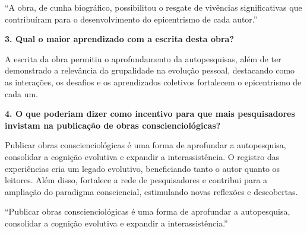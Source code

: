 \documentclass{gescons}
\begin{document}
\begin{multicols}{2}
\begin{pullquote}
``A obra, de cunha biográfico, possibilitou o resgate de vivências significativas que contribuíram para o desenvolvimento do epicentrismo de cada autor.''
\end{pullquote}


\textbf{3. Qual o maior aprendizado com a escrita desta obra?}

A escrita da obra permitiu o aprofundamento da autopesquisas, além de ter demonstrado a relevância da grupalidade na evolução pessoal, destacando como as interações, os desafios e os aprendizados coletivos fortalecem o epicentrismo de cada um. 


\textbf{4. O que poderiam dizer como incentivo para que mais pesquisadores invistam na publicação de obras conscienciológicas?}

Publicar obras conscienciológicas é uma forma de aprofundar a autopesquisa, consolidar a cognição evolutiva e expandir a interassistência. O registro das experiências cria um legado evolutivo, beneficiando tanto o autor quanto os leitores. Além disso, fortalece a rede de pesquisadores e contribui para a ampliação do paradigma consciencial, estimulando novas reflexões e descobertas.


\begin{pullquote}
``Publicar obras conscienciológicas é uma forma de aprofundar a autopesquisa, consolidar a cognição evolutiva e expandir a interassistência.''
\end{pullquote}




    \end{multicols}
\end{document}
